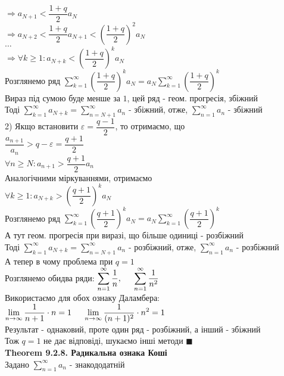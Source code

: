 \documentclass[a4paper, 14pt]{extarticle}
\def\huge{\displaystyle}
\def\bigline{\vspace{5mm}\\}
\def\th#1{\textbf{Theorem {#1}}}
\def\bigline{\vspace{5mm}\\}
\def\qed{$\blacksquare$}
\begin{document}
$\Rightarrow a_{N+1} < \dfrac{1+q}{2}a_N$\\
$\Rightarrow a_{N+2} < \dfrac{1+q}{2}a_{N+1} < \left( \dfrac{1+q}{2} \right)^2 a_N$\\
$\dots$\\
$\Rightarrow \forall k \geq 1: a_{N+k} < \left( \dfrac{1+q}{2} \right)^k a_N$\\
Розглянемо ряд $\huge \sum_{k=1}^{\infty} \left( \dfrac{1+q}{2} \right)^k a_N = a_N \sum_{k=1}^{\infty} \left( \dfrac{1+q}{2} \right)^k$\\
Вираз під сумою буде менше за $1$, цей ряд - геом. прогресія, збіжний\\
Тоді $\huge \sum_{k=1}^{\infty} a_{N+k} = \sum_{n = N+1}^{\infty} a_{n}$ - збіжний, отже, $\huge \sum_{n = 1}^{\infty} a_n$ - збіжний
\bigline
2) Якщо встановити $\varepsilon = \dfrac{q-1}{2}$, то отримаємо, що \\ $\dfrac{a_{n+1}}{a_n} > q - \varepsilon = \dfrac{q+1}{2}$\\
$\forall n \geq N: a_{n+1} > \dfrac{q+1}{2}a_n$\\
Аналогічними міркуваннями, отримаємо\\
$\forall k \geq 1: a_{N+k} > \left( \dfrac{q+1}{2} \right)^k a_N$\\
Розглянемо ряд $\huge \sum_{k=1}^{\infty} \left( \dfrac{q+1}{2} \right)^k a_N = a_N \sum_{k=1}^{\infty} \left( \dfrac{q+1}{2} \right)^k$\\
А тут геом. прогресія при виразі, що більше одиниці - розбіжний\\
Тоді $\huge \sum_{k=1}^{\infty} a_{N+k} = \sum_{n = N+1}^{\infty} a_{n}$ - розбіжний, отже, $\huge \sum_{n = 1}^{\infty} a_n$ - розбіжний
\bigline
А тепер в чому проблема при $q = 1$\\
Розглянемо обидва ряди: $\huge \sum_{n=1}^\infty \dfrac{1}{n}, \hspace{0.5cm} \sum_{n=1}^\infty \dfrac{1}{n^2}$\\
Використаємо для обох ознаку Даламбера:\\
$\huge \lim_{n \to \infty} \dfrac{1}{n+1} \cdot n = 1 \hspace{0.5cm} \lim_{n \to \infty} \dfrac{1}{(n+1)^2} \cdot n^2 = 1$\\
Результат - однаковий, проте один ряд - розбіжний, а інший - збіжний\\
Тож $q = 1$ не дає відповіді, шукаємо інші методи \qed
\bigline
\th{9.2.8. Радикальна ознака Коші}\\
Задано $\huge \sum_{n=1}^{\infty} a_n$ - знакододатній\\
\end{document}
